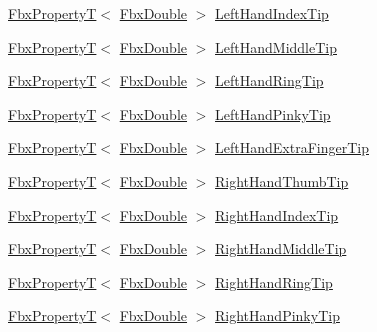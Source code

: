 \begin{DoxyCompactItemize}
\item 
\hyperlink{class_fbx_property_t}{Fbx\+PropertyT}$<$ \hyperlink{fbxtypes_8h_a171e72a1c46fc15c1a6c9c31948c1c5b}{Fbx\+Double} $>$ \hyperlink{class_fbx_character_a1ae3703bd72f19cff4b80605c1480821}{Left\+Hand\+Index\+Tip}
\item 
\hyperlink{class_fbx_property_t}{Fbx\+PropertyT}$<$ \hyperlink{fbxtypes_8h_a171e72a1c46fc15c1a6c9c31948c1c5b}{Fbx\+Double} $>$ \hyperlink{class_fbx_character_ab5cf7b96b3813681933bd9e2e029f2aa}{Left\+Hand\+Middle\+Tip}
\item 
\hyperlink{class_fbx_property_t}{Fbx\+PropertyT}$<$ \hyperlink{fbxtypes_8h_a171e72a1c46fc15c1a6c9c31948c1c5b}{Fbx\+Double} $>$ \hyperlink{class_fbx_character_a73d70325554e1716f7a4917bfb16a722}{Left\+Hand\+Ring\+Tip}
\item 
\hyperlink{class_fbx_property_t}{Fbx\+PropertyT}$<$ \hyperlink{fbxtypes_8h_a171e72a1c46fc15c1a6c9c31948c1c5b}{Fbx\+Double} $>$ \hyperlink{class_fbx_character_a3e595eab0e31e032d0c4d47599413cce}{Left\+Hand\+Pinky\+Tip}
\item 
\hyperlink{class_fbx_property_t}{Fbx\+PropertyT}$<$ \hyperlink{fbxtypes_8h_a171e72a1c46fc15c1a6c9c31948c1c5b}{Fbx\+Double} $>$ \hyperlink{class_fbx_character_a3a19b1cede7154da466412bb01220f2c}{Left\+Hand\+Extra\+Finger\+Tip}
\item 
\hyperlink{class_fbx_property_t}{Fbx\+PropertyT}$<$ \hyperlink{fbxtypes_8h_a171e72a1c46fc15c1a6c9c31948c1c5b}{Fbx\+Double} $>$ \hyperlink{class_fbx_character_a9f4c954aa28a467e6ff84c2a596b308c}{Right\+Hand\+Thumb\+Tip}
\item 
\hyperlink{class_fbx_property_t}{Fbx\+PropertyT}$<$ \hyperlink{fbxtypes_8h_a171e72a1c46fc15c1a6c9c31948c1c5b}{Fbx\+Double} $>$ \hyperlink{class_fbx_character_a7599d646c7b02676c0f769b23d62d9ee}{Right\+Hand\+Index\+Tip}
\item 
\hyperlink{class_fbx_property_t}{Fbx\+PropertyT}$<$ \hyperlink{fbxtypes_8h_a171e72a1c46fc15c1a6c9c31948c1c5b}{Fbx\+Double} $>$ \hyperlink{class_fbx_character_aee0243e27c5375f5e34ffdf222982f91}{Right\+Hand\+Middle\+Tip}
\item 
\hyperlink{class_fbx_property_t}{Fbx\+PropertyT}$<$ \hyperlink{fbxtypes_8h_a171e72a1c46fc15c1a6c9c31948c1c5b}{Fbx\+Double} $>$ \hyperlink{class_fbx_character_ad548a4a5905ff45181d63479017ed12a}{Right\+Hand\+Ring\+Tip}
\item 
\hyperlink{class_fbx_property_t}{Fbx\+PropertyT}$<$ \hyperlink{fbxtypes_8h_a171e72a1c46fc15c1a6c9c31948c1c5b}{Fbx\+Double} $>$ \hyperlink{class_fbx_character_ae79ccd7cb9a3a5acb720b1ef6bda77c4}{Right\+Hand\+Pinky\+Tip}

\end{DoxyCompactItemize}
